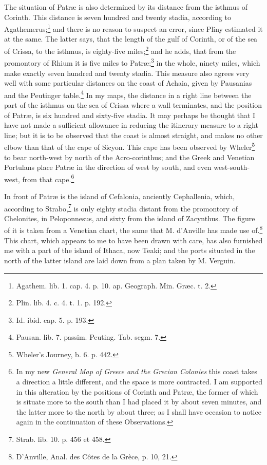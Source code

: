 \documentclass[a4paper, 11pt, oneside, polutonikogreek, english]{article}
\begin{document}
The situation of Patræ is also determined by its distance from the isthmus of Corinth. This distance is seven hundred and twenty stadia, according to Agathemerus;\footnote{Agathem. lib. 1. cap. 4. p. 10. ap. Geograph. Min. Græc. t. 2.} and there is no reason to suspect an error, since Pliny estimated it at the same. The latter says, that the length of the gulf of Corinth, or of the sea of Crissa, to the isthmus, is eighty-five miles;\footnote{Plin. lib. 4. c. 4. t. 1. p. 192.} and he adds, that from the promontory of Rhium it is five miles to Patræ;\footnote{Id. ibid. cap. 5. p. 193.} in the whole, ninety miles, which make exactly seven hundred and twenty stadia. This measure also agrees very well with some particular distances on the coast of Achaia, given by Pausanias and the Peutinger table.\footnote{Pausan. lib. 7. passim. Peuting. Tab. segm. 7.} In my maps, the distance in a right line between the part of the isthmus on the sea of Crissa where a wall terminates, and the position of Patræ, is six hundred and sixty-five stadia. It may perhaps be thought that I have not made a sufficient allowance in reducing the itinerary measure to a right line; but it is to be observed that the coast is almost straight, and makes no other elbow than that of the cape of Sicyon. This cape has been observed by Wheler\footnote{Wheler's Journey, b. 6. p. 442.} to bear north-west by north of the Acro-corinthus; and the Greek and Venetian Portulans place Patræ in the direction of west by south, and even west-south-west, from that cape.\footnote{In my new \emph{General Map of Greece and the Grecian Colonies} this coast takes a direction a little different, and the space is more contracted. I am supported in this alteration by the positions of Corinth and Patræ, the former of which is situate more to the south than I had placed it by about seven minutes, and the latter more to the north by about three; as I shall have occasion to notice again in the continuation of these Observations.}

In front of Patræ is the island of Cefalonia, anciently Cephallenia, which, according to Strabo,\footnote{Strab. lib. 10. p. 456 et 458.} is only eighty stadia distant from the promontory of Chelonites, in Peloponnesus, and sixty from the island of Zacynthus. The figure of it is taken from a Venetian chart, the same that M. d'Anville has made use of.\footnote{D'Anville, Anal. des Côtes de la Grèce, p. 10, 21.} This chart, which appears to me to have been drawn with care, has also furnished me with a part of the island of Ithaca, now Teaki; and the ports situated in the north of the latter island are laid down from a plan taken by M. Verguin.
\end{document}
